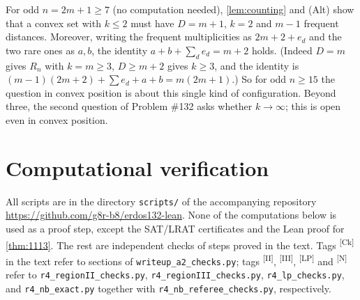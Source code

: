 \documentclass[11pt]{amsart}
\theoremstyle{definition}
\theoremstyle{remark}
\newcommand{\chk}[1]{\textsuperscript{[#1]}}
\begin{document}
For odd $n=2m+1\ge7$ (no computation needed), \cref{lem:counting} and (Alt) show that a convex set with $k\le2$ must have $D=m+1$, $k=2$ and $m-1$ frequent distances. Moreover, writing the frequent multiplicities as $2m+2+e_d$ and the two rare ones as $a,b$, the identity $a+b+\sum_de_d=m+2$ holds. (Indeed $D=m$ gives $R_n$ with $k=m\ge3$, $D\ge m+2$ gives $k\ge3$, and the identity is $(m-1)(2m+2)+\sum e_d+a+b=m(2m+1)$.) So for odd $n\ge15$ the question in convex position is about this single kind of configuration. Beyond three, the second question of Problem \#132 asks whether $k\to\infty$; this is open even in convex position.


\appendix
\section{Computational verification}\label{app:verification}

All scripts are in the directory \texttt{scripts/} of the accompanying repository \url{https://github.com/g8r-b8/erdos132-lean}. None of the computations below is used as a proof step, except the SAT/LRAT certificates and the Lean proof for \cref{thm:1113}. The rest are independent checks of steps proved in the text. Tags \chk{Ck} in the text refer to sections of \texttt{writeup\_a2\_checks.py}; tags \chk{II}, \chk{III}, \chk{LP} and \chk{N} refer to \texttt{r4\_regionII\_checks.py}, \texttt{r4\_regionIII\_checks.py}, \texttt{r4\_lp\_checks.py}, and \texttt{r4\_nb\_exact.py} together with \texttt{r4\_nb\_referee\_checks.py}, respectively.
\end{document}
